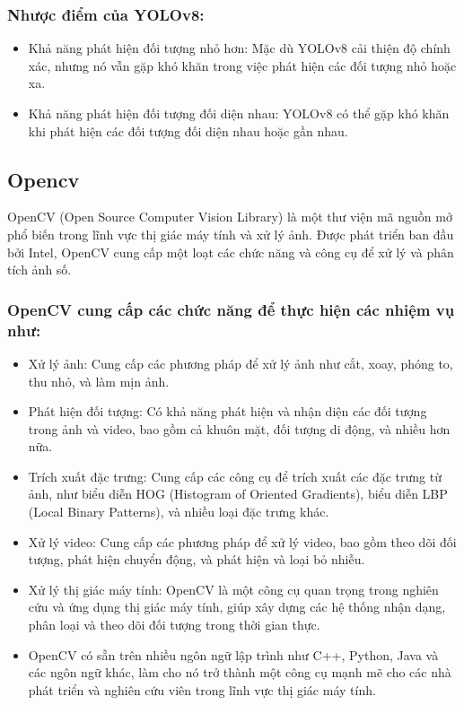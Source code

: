 \documentclass[a4paper]{article}
\begin{document}
\subsubsection{Nhược điểm của YOLOv8:}
\begin{itemize}
	\item Khả năng phát hiện đối tượng nhỏ hơn: Mặc dù YOLOv8 cải thiện độ chính xác, nhưng nó vẫn gặp khó khăn trong việc phát hiện các đối tượng nhỏ hoặc xa.
    \item Khả năng phát hiện đối tượng đối diện nhau: YOLOv8 có thể gặp khó khăn khi phát hiện các đối tượng đối diện nhau hoặc gần nhau.
\end{itemize}

\subsection{Opencv}
OpenCV (Open Source Computer Vision Library) là một thư viện mã nguồn mở phổ biến trong lĩnh vực thị giác máy tính và xử lý ảnh. Được phát triển ban đầu bởi Intel, OpenCV cung cấp một loạt các chức năng và công cụ để xử lý và phân tích ảnh số.
\subsubsection{OpenCV cung cấp các chức năng để thực hiện các nhiệm vụ như:}
\begin{itemize}
	\item Xử lý ảnh: Cung cấp các phương pháp để xử lý ảnh như cắt, xoay, phóng to, thu nhỏ, và làm mịn ảnh.
    \item Phát hiện đối tượng: Có khả năng phát hiện và nhận diện các đối tượng trong ảnh và video, bao gồm cả khuôn mặt, đối tượng di động, và nhiều hơn nữa.
    \item Trích xuất đặc trưng: Cung cấp các công cụ để trích xuất các đặc trưng từ ảnh, như biểu diễn HOG (Histogram of Oriented Gradients), biểu diễn LBP (Local Binary Patterns), và nhiều loại đặc trưng khác.
    \item Xử lý video: Cung cấp các phương pháp để xử lý video, bao gồm theo dõi đối tượng, phát hiện chuyển động, và phát hiện và loại bỏ nhiễu.
    \item Xử lý thị giác máy tính: OpenCV là một công cụ quan trọng trong nghiên cứu và ứng dụng thị giác máy tính, giúp xây dựng các hệ thống nhận dạng, phân loại và theo dõi đối tượng trong thời gian thực.
    \item OpenCV có sẵn trên nhiều ngôn ngữ lập trình như C++, Python, Java và các ngôn ngữ khác, làm cho nó trở thành một công cụ mạnh mẽ cho các nhà phát triển và nghiên cứu viên trong lĩnh vực thị giác máy tính.
\end{itemize}
\end{document}
